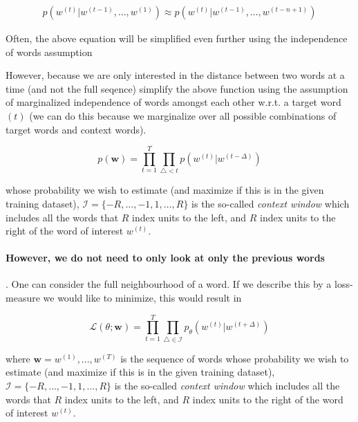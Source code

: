 \documentclass[a4paper,12pt,twoside,openright]{report}
\begin{document}
\begin{align}
p\left( w^{(t)} | w^{(t -1)}, \ldots, w^{(1)} \right) \approx p\left( w^{(t)} | w^{(t -1)}, \ldots, w^{(t - n + 1)} \right)
\end{align}

Often, the above equation will be simplified even further using the independence of words assumption

However, because we are only interested in the distance between two words at a time (and not the full seqence) \cite{bengio03} simplify the above function using the assumption of marginalized independence of words amongst each other w.r.t. a target word $(t)$ (we can do this because we marginalize over all possible combinations of target words and context words).

\begin{equation}
p(\mathbf{w})=\prod_{t=1}^{T} \prod_{\triangle < t} p\left( w^{(t)} | w^{(t -\Delta)}\right)
\end{equation}{\label{eq:naive_sequential_probability}}


 whose probability we wish to estimate (and maximize if this is in the given training dataset), $\mathcal{I}=\{-R, \ldots,-1,1, \ldots, R\}$ is the so-called \textit{context window} which includes all the words that $R$ index units to the left, and $R$ index units to the right of the word of interest $w^(t)$.

\paragraph{However, we do not need to only look at only the previous words}.
One can consider the full neighbourhood of a word.
If we describe this by a loss-measure we would like to minimize, this would result in 


\begin{equation}
\mathcal{L}(\theta ; \mathbf{w})=\prod_{t=1}^{T} \prod_{\triangle \in \mathcal{I}} p_{\theta}\left(w^{(t)} | w^{(t +\Delta)}\right)
\end{equation}{\label{eq:basic_equation_log_maximization}}

where $\mathbf{w} = w^{(1)}, \dots, w^{(T)} $ is the sequence of words whose probability we wish to estimate (and maximize if this is in the given training dataset), $\mathcal{I}=\{-R, \ldots,-1,1, \ldots, R\}$ is the so-called \textit{context window} which includes all the words that $R$ index units to the left, and $R$ index units to the right of the word of interest $w^(t)$.
\end{document}
